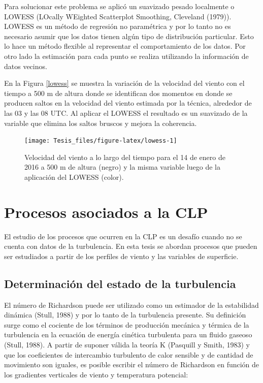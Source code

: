 \documentclass[12pt,spanish,oneside, a4paper]{book}
\begin{document}
Para solucionar este problema se aplicó un suavizado pesado localmente o
LOWESS (LOcally WEighted Scatterplot Smoothing, Cleveland (1979)).
LOWESS es un método de regresión no paramétrica y por lo tanto no es
necesario asumir que los datos tienen algún tipo de distribución
particular. Esto lo hace un método flexible al representar el
comportamiento de los datos. Por otro lado la estimación para cada punto
se realiza utilizando la información de datos vecinos.

En la Figura \ref{lowess} se muestra la variación de la velocidad del
viento con el tiempo a 500 m de altura donde se identifican dos momentos
en donde se producen saltos en la velocidad del viento estimada por la
técnica, alrededor de las 03 y las 08 UTC. Al aplicar el LOWESS el
resultado es un suavizado de la variable que elimina los saltos bruscos
y mejora la coherencia.

\begin{figure}

{\centering \texttt{[image: Tesis\_files/figure-latex/lowess-1]} 

}

\caption{Velocidad del viento a lo largo del tiempo para el 14 de enero de 2016 a 500 m de altura (negro) y la misma variable luego de la aplicación del LOWESS (color). \label{lowess}}\label{fig:lowess}
\end{figure}

\section{Procesos asociados a la CLP}\label{procesos-asociados-a-la-clp}

El estudio de los procesos que ocurren en la CLP es un desafío cuando no
se cuenta con datos de la turbulencia. En esta tesis se abordan procesos
que pueden ser estudiados a partir de los perfiles de viento y las
variables de superficie.

\subsection{Determinación del estado de la
turbulencia}\label{determinacion-del-estado-de-la-turbulencia}

El número de Richardson puede ser utilizado como un estimador de la
estabilidad dinámica (Stull, 1988) y por lo tanto de la turbulencia
presente. Su definición surge como el cociente de los términos de
producción mecánica y térmica de la turbulencia en la ecuación de
energía cinética turbulenta para un fluido gaseoso (Stull, 1988). A
partir de suponer válida la teoría K (Pasquill y Smith, 1983) y que los
coeficientes de intercambio turbulento de calor sensible y de cantidad
de movimiento son iguales, es posible escribir el número de Richardson
en función de los gradientes verticales de viento y temperatura
potencial:
\end{document}

